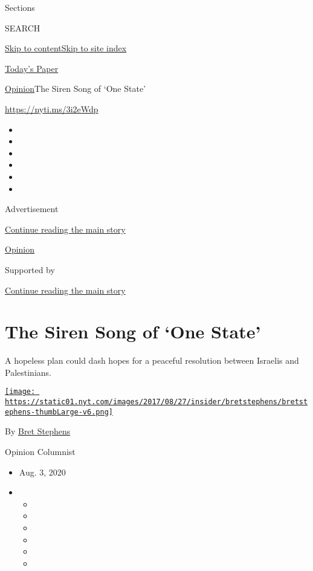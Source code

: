 Sections

SEARCH

\protect\hyperlink{site-content}{Skip to
content}\protect\hyperlink{site-index}{Skip to site index}

\href{https://myaccount.nytimes.com/auth/login?response_type=cookie\&client_id=vi}{}

\href{https://www.nytimes.com/section/todayspaper}{Today's Paper}

\href{/section/opinion}{Opinion}\textbar{}The Siren Song of `One State'

\href{https://nyti.ms/3i2eWdp}{https://nyti.ms/3i2eWdp}

\begin{itemize}
\item
\item
\item
\item
\item
\item
\end{itemize}

Advertisement

\protect\hyperlink{after-top}{Continue reading the main story}

\href{/section/opinion}{Opinion}

Supported by

\protect\hyperlink{after-sponsor}{Continue reading the main story}

\hypertarget{the-siren-song-of-one-state}{%
\section{The Siren Song of `One
State'}\label{the-siren-song-of-one-state}}

A hopeless plan could dash hopes for a peaceful resolution between
Israelis and Palestinians.

\href{https://www.nytimes.com/by/bret-stephens}{\texttt{[image: https://static01.nyt.com/images/2017/08/27/insider/bretstephens/bretstephens-thumbLarge-v6.png]}}

By \href{https://www.nytimes.com/by/bret-stephens}{Bret Stephens}

Opinion Columnist

\begin{itemize}
\item
  Aug. 3, 2020
\item
  \begin{itemize}
  \item
  \item
  \item
  \item
  \item
  \item
  \end{itemize}
\end{itemize}

